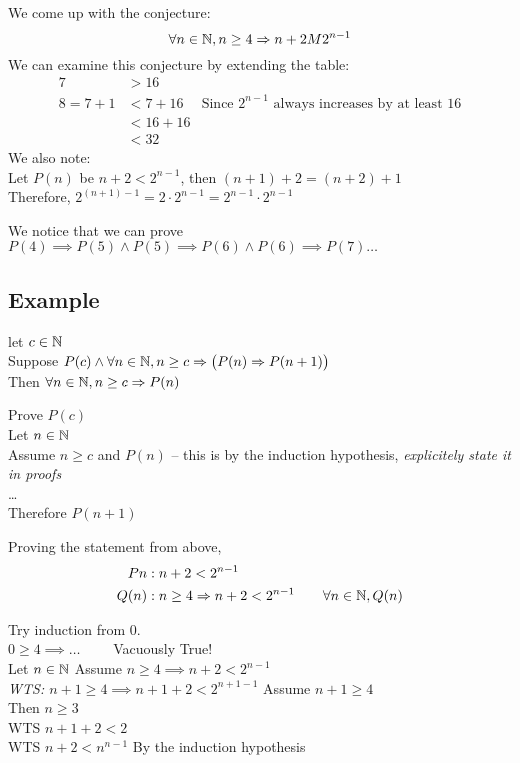 \documentclass[12pt, letterpaper, twoside]{article}
\begin{document}
We come up with the conjecture:
$$
\forall n \in \mathbb N, n \ge 4 \mathrel{\Rightarrow} n + 2 M 2^{n - 1}
$$
We can examine this conjecture by extending the table:
\begin{align*}
    7 &> 16\\
    8 = 7 + 1 &< 7 + 16 &\text{Since } 2^{n - 1} \text{ always increases by at least }16\\
    &< 16 + 16\\
    &< 32
\end{align*}
We also note:\\
Let $P(n)$ be $n + 2 < 2^{n - 1}$, then $(n + 1) + 2 = (n + 2) + 1$\\
Therefore, $2^{(n + 1) - 1} = 2 \cdot 2^{n - 1} = 2^{n - 1} \cdot 2^{n - 1}$

We notice that we can prove $P(4) \implies P(5) \land P(5) \implies P(6) \land P(6) \implies P(7) \dots$

\subsection*{Example}
let $c \in \mathbb N$\\
Suppose $P(c) \land \forall n \in \mathbb N, n \ge c \mathrel{\Rightarrow} \big(P(n) \mathrel{\Rightarrow} P(n + 1)\big)$\\
Then $\forall n \in \mathbb N, n \ge c \mathrel{\Rightarrow} P(n)$\\
\begin{aproofs}
    \base Prove $P(c)$\\
    \istep Let $n \in \mathbb N$\\
    Assume $n \ge c$ and $P(n)$ -- this is by the induction hypothesis, \emph{explicitely state it in proofs}\\
    \dots\\
    Therefore $P(n + 1)$
\end{aproofs}

Proving the statement from above, 
\begin{align*}
    P{n}&: n + 2 < 2^{n - 1}\\
    Q(n)&: n \ge 4 \mathrel{\Rightarrow} n + 2 < 2^{n - 1} \qquad \forall n \in \mathbb N, Q(n)
\end{align*}
\newpage
\begin{aproof}
    Try induction from 0.\\
    \base $0 \ge 4 \implies \dots \qquad$ Vacuously True!\\
    \istep Let $n \in \mathbb N$ Assume $n \ge 4 \implies n + 2 < 2^{n - 1}$\\
    \hspace*{10mm}\emph{WTS: $n + 1 \ge 4 \implies n + 1 + 2 < 2^{n + 1 - 1}$}
    Assume $n + 1 \ge 4$\\
    Then $n \ge 3$\\
    
     WTS $n + 1 + 2 < 2$\\
     WTS $n + 2 < n^{n - 1}$ By the induction hypothesis

\end{aproof}
\end{document}
